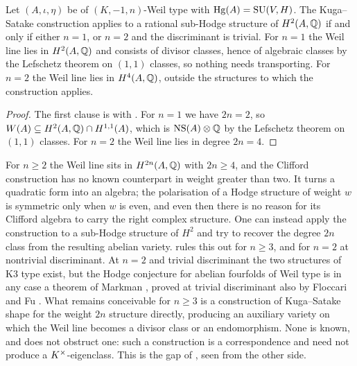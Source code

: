 \begin{corollary}\label{cor:ksboundary}
Let $(A,\iota,\eta)$ be of $(K,-1,n)$-Weil type with $\operatorname{Hg}(A)=\operatorname{SU}(V,H)$. The
Kuga--Satake construction applies to a rational sub-Hodge structure of
$H^{2}(A,\mathbb{Q})$ if and only if either $n=1$, or $n=2$ and the discriminant is
trivial. For $n=1$ the Weil line lies in $H^{2}(A,\mathbb{Q})$ and consists of
divisor classes, hence of algebraic classes by the Lefschetz theorem on
$(1,1)$ classes, so nothing needs transporting. For $n=2$ the Weil line lies
in $H^{4}(A,\mathbb{Q})$, outside the structures to which the construction applies.
\end{corollary}

\begin{proof}
The first clause is  with . For $n=1$
we have $2n=2$, so $W(A)\subseteq H^{2}(A,\mathbb{Q})\cap H^{1,1}(A)$, which is
$\mathrm{NS}(A)\otimes\mathbb{Q}$ by the Lefschetz theorem on $(1,1)$ classes. For $n=2$ the
Weil line lies in degree $2n=4$.
\end{proof}

\begin{remark}\label{rem:nohigherks}
For $n\ge2$ the Weil line sits in $H^{2n}(A,\mathbb{Q})$ with $2n\ge4$, and the
Clifford construction has no known counterpart in weight greater than two. It
turns a quadratic form into an algebra; the polarisation of a Hodge structure
of weight $w$ is symmetric only when $w$ is even, and even then there is no
reason for its Clifford algebra to carry the right complex structure. One
can instead apply the construction to a sub-Hodge structure of $H^{2}$ and
try to recover the degree $2n$ class from the resulting abelian variety.
 rules this out for $n\ge3$, and for $n=2$ at nontrivial
discriminant. At $n=2$ and trivial discriminant the two structures of K3 type
exist, but the Hodge conjecture for abelian fourfolds of Weil type is in any
case a theorem of Markman \cite{Mar25a,Mar25b}, proved at trivial
discriminant also by Floccari and Fu \cite{FF26}. What remains conceivable for
$n\ge3$ is a construction of Kuga--Satake shape for the weight $2n$ structure
directly, producing an auxiliary variety on which the Weil line becomes a
divisor class or an endomorphism. None is known, and  does
not obstruct one: such a construction is a correspondence and need not
produce a $K^{\times}$-eigenclass. This is the gap of ,
seen from the other side.
\end{remark}

